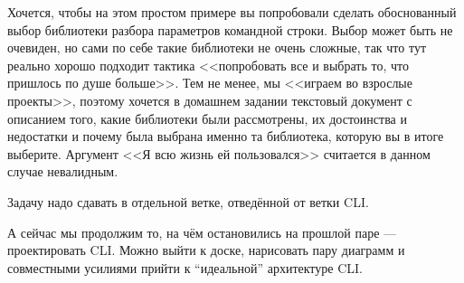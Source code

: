 \documentclass[a5paper]{article}
\begin{document}
Хочется, чтобы на этом простом примере вы попробовали сделать обоснованный выбор библиотеки разбора параметров командной строки. Выбор может быть не очевиден, но сами по себе такие библиотеки не очень сложные, так что тут реально хорошо подходит тактика <<попробовать все и выбрать то, что пришлось по душе больше>>. Тем не менее, мы <<играем во взрослые проекты>>, поэтому хочется в домашнем задании текстовый документ с описанием того, какие библиотеки были рассмотрены, их достоинства и недостатки и почему была выбрана именно та библиотека, которую вы в итоге выберите. Аргумент <<Я всю жизнь ей пользовался>> считается в данном случае невалидным.

Задачу надо сдавать в отдельной ветке, отведённой от ветки CLI.

А сейчас мы продолжим то, на чём остановились на прошлой паре --- проектировать CLI. Можно выйти к доске, нарисовать пару диаграмм и совместными усилиями прийти к ``идеальной'' архитектуре CLI.
\end{document}

